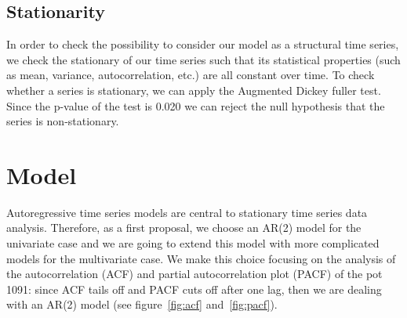 \documentclass{article}
\begin{document}
\subsection{Stationarity}

In order to check the possibility to consider our model as a structural time series, we check the stationary of our time series such that its statistical properties (such as mean, variance, autocorrelation, etc.) are all constant over time. 
To check whether a series is stationary, we can apply the Augmented Dickey fuller test.
Since the p-value of the test is 0.020 we can reject the null hypothesis that the series is non-stationary. 

\section{Model}
Autoregressive time series models are central to stationary time series data analysis. Therefore, as  a first proposal, we choose an AR(2) model for the univariate case and we are going to extend this model with more complicated models for the multivariate case. We make this choice focusing on the analysis of the autocorrelation (ACF) and partial autocorrelation plot (PACF) of the pot 1091: 
since ACF tails off and PACF cuts off after one lag, then we are dealing with an AR(2) model (see figure~\ref{fig:acf} and~\ref{fig:pacf}).
\end{document}
